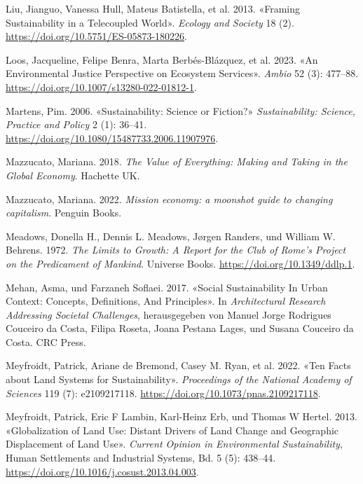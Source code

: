 \documentclass[
  nswissgerman,
  a4paper,
  DIV=11,
  numbers=noendperiod,
  oneside,
  openany]{scrreprt}
\newlength{\cslhangindent}
\newenvironment{CSLReferences}[2] %
 {\begin{list}{}{%
  \setlength{\itemindent}{0pt}
  \setlength{\leftmargin}{0pt}
  \setlength{\parsep}{0pt}
  \ifodd #1
   \setlength{\leftmargin}{\cslhangindent}
   \setlength{\itemindent}{-1\cslhangindent}
  \fi
  \setlength{\itemsep}{#2\baselineskip}}}
 {\end{list}}
\begin{document}
\begin{CSLReferences}{1}{1}
{Liu, Jianguo, Vanessa Hull, Mateus Batistella, et al.} 2013. {«Framing
{Sustainability} in a {Telecoupled World}»}. \emph{Ecology and Society}
18 (2). \url{https://doi.org/10.5751/ES-05873-180226}.

Loos, Jacqueline, Felipe Benra, Marta Berbés-Blázquez, et al. 2023. {«An
Environmental Justice Perspective on Ecosystem Services»}. \emph{Ambio}
52 (3): 477--88. \url{https://doi.org/10.1007/s13280-022-01812-1}.

Martens, Pim. 2006. {«Sustainability: Science or Fiction?»}
\emph{Sustainability: Science, Practice and Policy} 2 (1): 36--41.
\url{https://doi.org/10.1080/15487733.2006.11907976}.

Mazzucato, Mariana. 2018. \emph{The Value of Everything: {Making} and
Taking in the Global Economy}. Hachette UK.

Mazzucato, Mariana. 2022. \emph{Mission economy: a moonshot guide to
changing capitalism}. Penguin Books.

Meadows, Donella H., Dennis L. Meadows, Jørgen Randers, und William W.
Behrens. 1972. \emph{The {Limits} to {Growth}: {A} Report for the {Club}
of {Rome}'s {Project} on the {Predicament} of {Mankind}}. Universe
Books. \url{https://doi.org/10.1349/ddlp.1}.

Mehan, Asma, und Farzaneh Soflaei. 2017. {«Social {Sustainability In
Urban Context}: {Concepts}, {Definitions}, {And Principles}»}. In
\emph{Architectural {Research Addressing Societal Challenges}},
herausgegeben von Manuel Jorge Rodrigues Couceiro da Costa, Filipa
Roseta, Joana Pestana Lages, und Susana Couceiro da Costa. CRC Press.

{Meyfroidt, Patrick, Ariane de Bremond, Casey M. Ryan, et al.} 2022.
{«Ten Facts about Land Systems for Sustainability»}. \emph{Proceedings
of the National Academy of Sciences} 119 (7): e2109217118.
\url{https://doi.org/10.1073/pnas.2109217118}.

Meyfroidt, Patrick, Eric F Lambin, Karl-Heinz Erb, und Thomas W Hertel.
2013. {«Globalization of Land Use: Distant Drivers of Land Change and
Geographic Displacement of Land Use»}. \emph{Current Opinion in
Environmental Sustainability}, Human Settlements and Industrial Systems,
Bd. 5 (5): 438--44. \url{https://doi.org/10.1016/j.cosust.2013.04.003}.


\end{CSLReferences}
\end{document}
